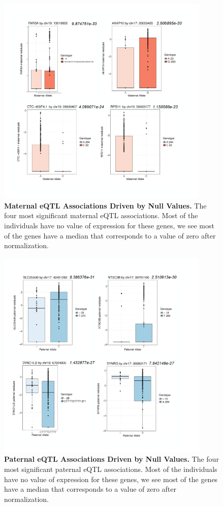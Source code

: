 \begin{figure}[!htb]
\centering \includegraphics[width=4in]{img/ch04/fig-04-mat-eQTL.pdf}
\caption[Maternal eQTL Associations Driven by Null Values.]{\textbf{Maternal eQTL Associations Driven by Null Values.} The four most significant maternal eQTL associations. Most of the individuals have no value of expression for these genes, we see most of the genes have a median that corresponds to a value of zero after normalization. }
\label{fig:mat-eQTL}
\end{figure}

\begin{figure}[!htb]
\centering \includegraphics[width=4in]{img/ch04/fig-05-pat-eQTL.pdf}
\caption[Paternal eQTL Associations Driven by Null Values.]{\textbf{Paternal eQTL Associations Driven by Null Values.} The four most significant paternal eQTL associations. Most of the individuals have no value of expression for these genes, we see most of the genes have a median that corresponds to a value of zero after normalization. }
\label{fig:pat-eQTL}
\end{figure}


